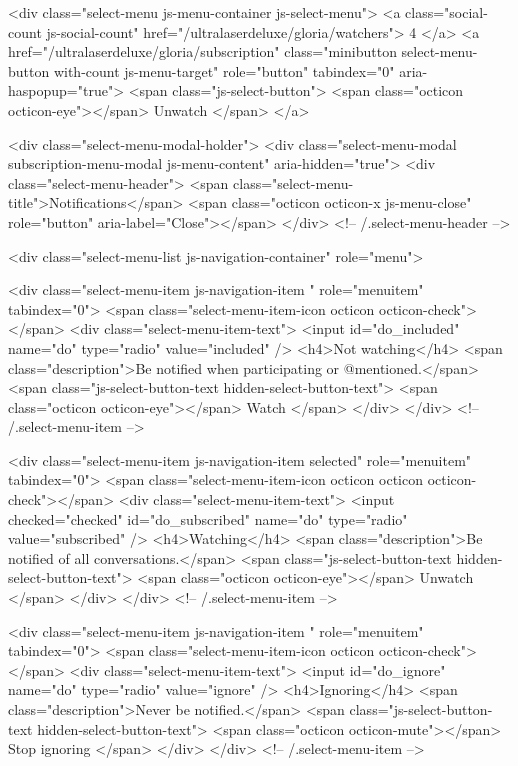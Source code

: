     <div class="select-menu js-menu-container js-select-menu">
      <a class="social-count js-social-count" href="/ultralaserdeluxe/gloria/watchers">
        4
      </a>
      <a href="/ultralaserdeluxe/gloria/subscription"
        class="minibutton select-menu-button with-count js-menu-target" role="button" tabindex="0" aria-haspopup="true">
        <span class="js-select-button">
          <span class="octicon octicon-eye"></span>
          Unwatch
        </span>
      </a>

      <div class="select-menu-modal-holder">
        <div class="select-menu-modal subscription-menu-modal js-menu-content" aria-hidden="true">
          <div class="select-menu-header">
            <span class="select-menu-title">Notifications</span>
            <span class="octicon octicon-x js-menu-close" role="button" aria-label="Close"></span>
          </div> <!-- /.select-menu-header -->

          <div class="select-menu-list js-navigation-container" role="menu">

            <div class="select-menu-item js-navigation-item " role="menuitem" tabindex="0">
              <span class="select-menu-item-icon octicon octicon-check"></span>
              <div class="select-menu-item-text">
                <input id="do_included" name="do" type="radio" value="included" />
                <h4>Not watching</h4>
                <span class="description">Be notified when participating or @mentioned.</span>
                <span class="js-select-button-text hidden-select-button-text">
                  <span class="octicon octicon-eye"></span>
                  Watch
                </span>
              </div>
            </div> <!-- /.select-menu-item -->

            <div class="select-menu-item js-navigation-item selected" role="menuitem" tabindex="0">
              <span class="select-menu-item-icon octicon octicon octicon-check"></span>
              <div class="select-menu-item-text">
                <input checked="checked" id="do_subscribed" name="do" type="radio" value="subscribed" />
                <h4>Watching</h4>
                <span class="description">Be notified of all conversations.</span>
                <span class="js-select-button-text hidden-select-button-text">
                  <span class="octicon octicon-eye"></span>
                  Unwatch
                </span>
              </div>
            </div> <!-- /.select-menu-item -->

            <div class="select-menu-item js-navigation-item " role="menuitem" tabindex="0">
              <span class="select-menu-item-icon octicon octicon-check"></span>
              <div class="select-menu-item-text">
                <input id="do_ignore" name="do" type="radio" value="ignore" />
                <h4>Ignoring</h4>
                <span class="description">Never be notified.</span>
                <span class="js-select-button-text hidden-select-button-text">
                  <span class="octicon octicon-mute"></span>
                  Stop ignoring
                </span>
              </div>
            </div> <!-- /.select-menu-item -->

